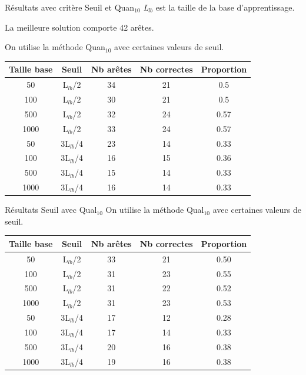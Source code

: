 \documentclass{beamer}
\begin{document}
\begin{frame}{Résultats avec critère Seuil et Quan$_{10}$}
\emph{L$_{lb}$} est la taille de la base d'apprentissage. 

La meilleure solution comporte 42 arêtes.

On utilise la méthode Quan$_{10}$ avec certaines valeurs de seuil.

\begin{tabular}{|c|c|c|c|c|}
   \hline
   Taille base & Seuil & Nb arêtes & Nb correctes & Proportion\\
   \hline
   50 & L$_{lb}$/2 & 34 & 21 & 0.5  \\   
   \hline
   100 & L$_{lb}$/2 & 30 & 21 & 0.5  \\
   \hline
   500 & L$_{lb}$/2 & 32 & 24 & 0.57  \\
   \hline
   1000 & L$_{lb}$/2 & 33 & 24 & 0.57  \\
   \hline
   \hline
   50 & 3L$_{lb}$/4 & 23 & 14 & 0.33  \\
   \hline
   100 & 3L$_{lb}$/4 & 16 & 15 & 0.36  \\
   \hline
   500 & 3L$_{lb}$/4 & 15 & 14 & 0.33  \\
   \hline
   1000 & 3L$_{lb}$/4 & 16 & 14 & 0.33  \\
   \hline
\end{tabular}


\end{frame}

\begin{frame}{Résultats Seuil avec Qual$_{10}$}
On utilise la méthode Qual$_{10}$ avec certaines valeurs de seuil.
\begin{tabular}{|c|c|c|c|c|}
   \hline
   Taille base & Seuil & Nb arêtes & Nb correctes & Proportion\\
    \hline
   50 & L$_{lb}$/2 & 33 & 21 & 0.50  \\
   \hline
   100 & L$_{lb}$/2 & 31 & 23 & 0.55  \\
   \hline
   500 & L$_{lb}$/2 & 31 & 22 & 0.52  \\
   \hline
   1000 & L$_{lb}$/2 & 31 & 23 & 0.53  \\
   \hline
   \hline
   50 & 3L$_{lb}$/4 & 17 & 12 & 0.28  \\
   \hline
   100 & 3L$_{lb}$/4 & 17 & 14 & 0.33  \\
   \hline
   500 & 3L$_{lb}$/4 & 20 & 16 & 0.38  \\
   \hline
   1000 & 3L$_{lb}$/4 & 19 & 16 & 0.38  \\
   \hline
\end{tabular}
\end{frame}
\end{document}
